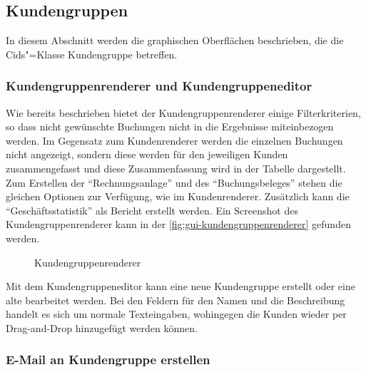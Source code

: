 
\subsection{Kundengruppen}
In diesem Abschnitt werden die graphischen Oberflächen beschrieben, die die Cids"=Klasse Kundengruppe betreffen.
\subsubsection{Kundengruppenrenderer und Kundengruppeneditor}
Wie bereits beschrieben bietet der Kundengruppenrenderer einige Filterkriterien, so dass nicht gewünschte Buchungen nicht in die Ergebnisse miteinbezogen werden.
Im Gegensatz zum Kundenrenderer werden die einzelnen Buchungen nicht angezeigt, sondern diese werden für den jeweiligen Kunden zusammengefasst und diese Zusammenfassung wird in der Tabelle dargestellt.
Zum Erstellen der \enquote{Rechnungsanlage} und des \enquote{Buchungsbeleges} stehen die gleichen Optionen zur Verfügung, wie im Kundenrenderer.
Zusätzlich kann die \enquote{Geschäftsstatistik} als Bericht erstellt werden.
Ein Screenshot des Kundengruppenrenderer kann in der \autoref{fig:gui-kundengruppenrenderer} gefunden werden.
\begin{figure}[htb]
	\centering
	\caption{Kundengruppenrenderer}
	\label{fig:gui-kundengruppenrenderer}
\end{figure}

Mit dem Kundengruppeneditor kann eine neue Kundengruppe erstellt oder eine alte bearbeitet werden. Bei den Feldern für den Namen und die Beschreibung handelt es sich um normale Texteingaben, wohingegen die Kunden wieder per Drag-and-Drop hinzugefügt werden können.


\subsubsection{E-Mail an Kundengruppe erstellen}

